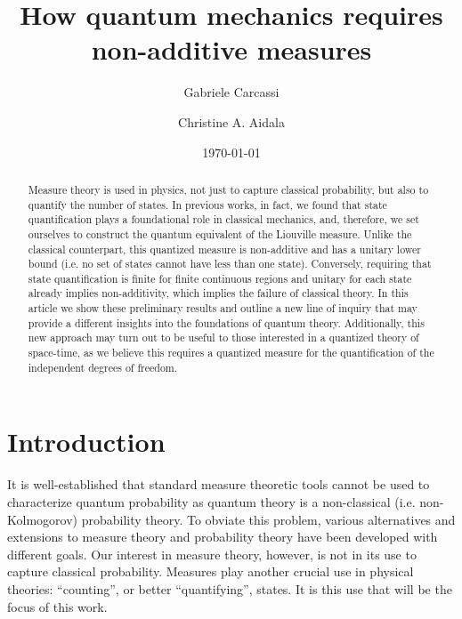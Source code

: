 \documentclass[10pt,twocolumn, nofootinbib]{revtex4-2}
\begin{document}
\title{How quantum mechanics requires non-additive measures}
\author{Gabriele Carcassi}
\author{Christine A. Aidala}

\date{\today}


\begin{abstract}
	Measure theory is used in physics, not just to capture classical probability, but also to quantify the number of states. In previous works, in fact, we found that state quantification plays a foundational role in classical mechanics, and, therefore, we set ourselves to construct the quantum equivalent of the Liouville measure. Unlike the classical counterpart, this quantized measure is non-additive and has a unitary lower bound (i.e. no set of states cannot have less than one state). Conversely, requiring that state quantification is finite for finite continuous regions and unitary for each state already implies non-additivity, which implies the failure of classical theory. In this article we show these preliminary results and outline a new line of inquiry that may provide a different insights into the foundations of quantum theory. Additionally, this new approach may turn out to be useful to those interested in a quantized theory of space-time, as we believe this requires a quantized measure for the quantification of the independent degrees of freedom.
\end{abstract}

\maketitle

\section{Introduction}

It is well-established that standard measure theoretic tools cannot be used to characterize quantum probability as quantum theory is a non-classical (i.e. non-Kolmogorov) probability theory. To obviate this problem, various alternatives and extensions to measure theory and probability theory have been developed with different goals.\cite{groenewold1946principles, moyal1949quantum, gleason1975measures, sorkin1994quantum, hamhalter2013quantum, svozil2022extending, monchietti2023measure} Our interest in measure theory, however, is not in its use to capture classical probability. Measures play another crucial use in physical theories: ``counting'', or better ``quantifying'', states. It is this use that will be the focus of this work.
\end{document}
